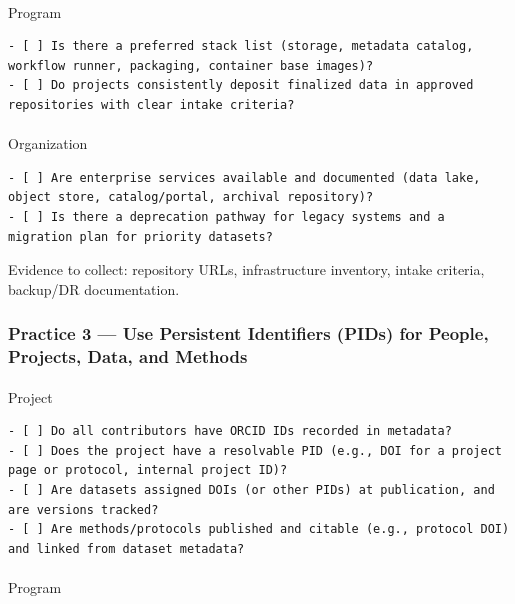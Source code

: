 \documentclass[
  letterpaper,
  DIV=11,
  numbers=noendperiod]{scrartcl}
\makeatletter
\let\oldparagraph\paragraph
\renewcommand{\paragraph}{
    \@ifstar
      \xxxParagraphStar
      \xxxParagraphNoStar
  }
\newcommand{\xxxParagraphStar}[1]{\oldparagraph*{#1}\mbox{}}
\newcommand{\xxxParagraphNoStar}[1]{\oldparagraph{#1}\mbox{}}
\makeatother
\begin{document}
\paragraph{Program}\label{program-1}

\begin{verbatim}
- [ ] Is there a preferred stack list (storage, metadata catalog, workflow runner, packaging, container base images)?
- [ ] Do projects consistently deposit finalized data in approved repositories with clear intake criteria?
\end{verbatim}

\paragraph{Organization}\label{organization-1}

\begin{verbatim}
- [ ] Are enterprise services available and documented (data lake, object store, catalog/portal, archival repository)?
- [ ] Is there a deprecation pathway for legacy systems and a migration plan for priority datasets?
\end{verbatim}

Evidence to collect: repository URLs, infrastructure inventory, intake
criteria, backup/DR documentation.

\subsubsection{Practice 3 --- Use Persistent Identifiers (PIDs) for
People, Projects, Data, and
Methods}\label{practice-3-use-persistent-identifiers-pids-for-people-projects-data-and-methods}

\paragraph{Project}\label{project-2}

\begin{verbatim}
- [ ] Do all contributors have ORCID IDs recorded in metadata?
- [ ] Does the project have a resolvable PID (e.g., DOI for a project page or protocol, internal project ID)?
- [ ] Are datasets assigned DOIs (or other PIDs) at publication, and are versions tracked?
- [ ] Are methods/protocols published and citable (e.g., protocol DOI) and linked from dataset metadata?
\end{verbatim}

\paragraph{Program}\label{program-2}
\end{document}
